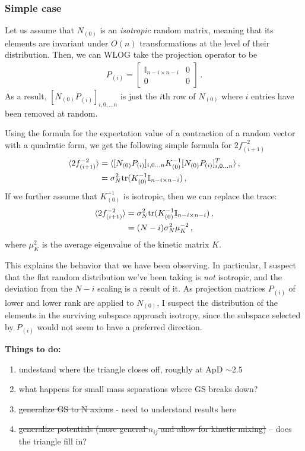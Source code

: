 \documentclass[11pt]{article}
\begin{document}
\subsubsection{Simple case}
Let us assume that $N_{(0)}$ is an \emph{isotropic} random matrix, meaning that its elements are invariant under $O(n)$ transformations at the level of their distribution. Then, we can WLOG take the projection operator to be
\begin{align}
    P_{(i)} = \left[\begin{array}{cc}{\mathbb I}_{n - i\times n - i}&0\\0&0\end{array}\right]\,.
\end{align}
As a result, $[N_{(0)} P_{(i)}]_{i,0,\dots n}$ is just the $i$th row of $N_{(0)}$ where $i$ entries have been removed at random.

Using the formula for the expectation value of a contraction of a random vector with a quadratic form, we get the following simple formula for $2f_{(i + 1)}^{-2}$
\begin{align}
    \langle2 f_{(i + 1)}^{-2}\rangle &= \langle [N_{(0)} P_{(i)}]_{i,0\dots n} K_{(0)}^{-1}[N_{(0)} P_{(i)}]_{i,0\dots n}^T \rangle\,,\\
    &=\sigma_N^2{\rm tr}(K_{(0)}^{-1}{\mathbb I}_{n - i\times n  - i})\,,
\end{align}
If we further assume that $K_{(0)}^{-1}$ is isotropic, then we can replace the trace:
\begin{align}
    \langle2 f_{(i + 1)}^{-2}\rangle &= \sigma_N^2{\rm tr}(K_{(0)}^{-1}{\mathbb I}_{n - i\times n  - i})\,,\\
    &=(N - i)\sigma_N^2\mu_K^{-2}\,,
\end{align}
where $\mu_K^2$ is the average eigenvalue of the kinetic matrix $K$. 


This explains the behavior that we have been observing. In particular, I suspect that the flat random distribution we've been taking is \emph{not} isotropic, and the deviation from the $N - i$ scaling is a result of it. As projection matrices $P_{(i)}$ of lower and lower rank are applied to $N_{(0)}$, I suspect the distribution of the elements in the surviving subspace approach isotropy, since the subspace selected by $P_{(i)}$ would not seem to have a preferred direction.

\pagebreak

\color{red}\noindent \textbf{Things to do:}
\begin{enumerate}
    \item undestand where the triangle closes off, roughly at ApD $\sim 2.5$
    \item what happens for small mass separations where GS breaks down?
    \item \st{generalize GS to N axions} - need to understand results here
    \item \st{generalize potentials (more general $n_{ij}$ and allow for kinetic mixing) }– does the triangle fill in?
\end{enumerate}\color{black}
\end{document}
